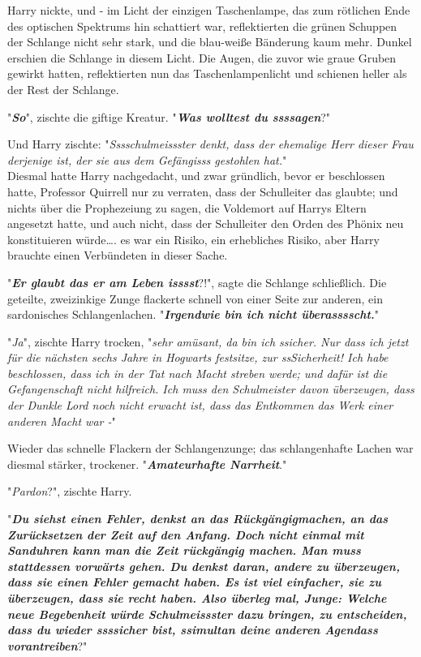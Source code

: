 {Harry nickte, und - im Licht der einzigen Taschenlampe, das zum rötlichen Ende des optischen Spektrums hin schattiert war, reflektierten die grünen Schuppen der Schlange nicht sehr stark, und die blau-weiße Bänderung kaum mehr. Dunkel erschien die Schlange in diesem Licht. Die Augen, die zuvor wie graue Gruben gewirkt hatten, reflektierten nun das Taschenlampenlicht und schienen heller als der Rest der Schlange.

"\textbf{\emph{So}}", zischte die giftige Kreatur. "\textbf{\emph{Was wolltest du ssssagen}}?"

Und Harry zischte: "\emph{Sssschulmeissster denkt, dass der ehemalige Herr dieser Frau derjenige ist, der sie aus dem Gefängisss gestohlen hat.}"\\ Diesmal hatte Harry nachgedacht, und zwar gründlich, bevor er beschlossen hatte, Professor Quirrell nur zu verraten, dass der Schulleiter das glaubte; und nichts über die Prophezeiung zu sagen, die Voldemort auf Harrys Eltern angesetzt hatte, und auch nicht, dass der Schulleiter den Orden des Phönix neu konstituieren würde…. es war ein Risiko, ein erhebliches Risiko, aber Harry brauchte einen Verbündeten in dieser Sache.

"\textbf{\emph{Er glaubt das er am Leben isssst}}?!", sagte die Schlange schließlich. Die geteilte, zweizinkige Zunge flackerte schnell von einer Seite zur anderen, ein sardonisches Schlangenlachen. "\textbf{\emph{Irgendwie bin ich nicht überasssscht.}}"

"\emph{Ja}", zischte Harry trocken, "\emph{sehr amüsant, da bin ich ssicher. Nur dass ich jetzt für die nächsten sechs Jahre in Hogwarts festsitze, zur ssSicherheit! Ich habe beschlossen, dass ich in der Tat nach Macht streben werde; und dafür ist die Gefangenschaft nicht hilfreich. Ich muss den Schulmeister davon überzeugen, dass der Dunkle Lord noch nicht erwacht ist, dass das Entkommen das Werk einer anderen Macht war -}"

Wieder das schnelle Flackern der Schlangenzunge; das schlangenhafte Lachen war diesmal stärker, trockener. "\textbf{\emph{Amateurhafte Narrheit}}."

"\emph{Pardon}?", zischte Harry.

"\textbf{\emph{Du siehst einen Fehler, denkst an das Rückgängigmachen, an das Zurücksetzen der Zeit auf den Anfang. Doch nicht einmal mit Sanduhren kann man die Zeit rückgängig machen. Man muss stattdessen vorwärts gehen. Du denkst daran, andere zu überzeugen, dass sie einen Fehler gemacht haben. Es ist viel einfacher, sie zu überzeugen, dass sie recht haben. Also überleg mal, Junge: Welche neue Begebenheit würde Schulmeissster dazu bringen, zu entscheiden, dass du wieder ssssicher bist, ssimultan deine anderen Agendass vorantreiben}}?"

}
